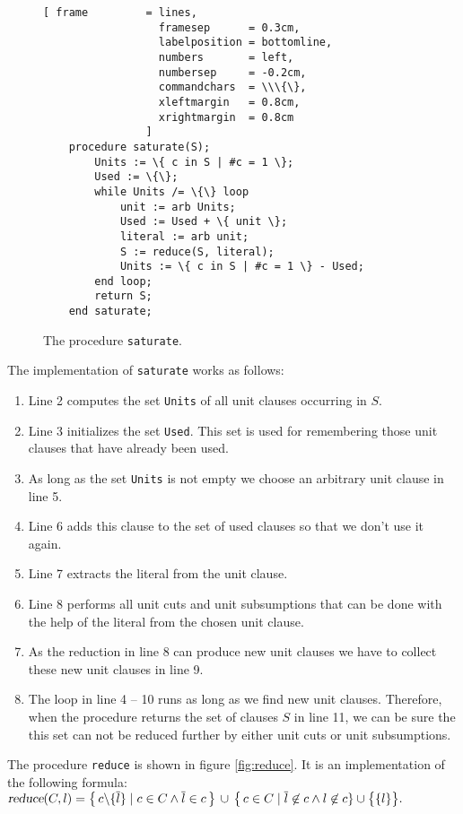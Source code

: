 \begin{figure}[!ht]
  \centering
\begin{Verbatim}[ frame         = lines, 
                  framesep      = 0.3cm, 
                  labelposition = bottomline,
                  numbers       = left,
                  numbersep     = -0.2cm,
                  commandchars  = \\\{\},
                  xleftmargin   = 0.8cm,
                  xrightmargin  = 0.8cm
                ]
    procedure saturate(S);
        Units := \{ c in S | #c = 1 \};
        Used := \{\};
        while Units /= \{\} loop
            unit := arb Units;
            Used := Used + \{ unit \};
            literal := arb unit;
            S := reduce(S, literal);
            Units := \{ c in S | #c = 1 \} - Used;        
        end loop;
        return S;
    end saturate;
\end{Verbatim}
\vspace*{-0.3cm}
  \caption{The procedure \texttt{saturate}.}
  \label{fig:saturate}
\end{figure} 
The implementation of  \texttt{saturate} works as follows: 
\begin{enumerate}
\item Line 2 computes the set \texttt{Units} of all unit clauses occurring in $S$.  
\item Line 3 initializes the set \texttt{Used}.  This set is used for remembering
      those unit clauses that have already been used.
\item As long as the set  \texttt{Units} is not empty we choose an arbitrary 
      unit clause in line 5.
\item Line 6 adds this clause to the set of used clauses so that we don't use it again.
\item Line 7 extracts the literal from the unit clause.
\item Line 8 performs all unit cuts and unit subsumptions that can be done
      with the help of the literal from the chosen unit clause.
\item As the reduction in line 8 can produce new unit clauses we have to collect these new
      unit clauses in line 9.
\item The loop in line  4 -- 10 runs as long as we find new unit clauses.
      Therefore, when the procedure returns the set of clauses $S$ in line 11, 
      we can be sure the this set can not be reduced further by either unit cuts or unit subsumptions.
\end{enumerate}
The procedure \texttt{reduce} is shown in figure \ref{fig:reduce}.
It is an implementation of the following formula:
\\[0.2cm]
\hspace*{1.3cm}
$\textsl{reduce}(C,l)  = 
 \bigl\{\, c \backslash \{\overline{l}\} \;|\; c \in C \wedge \overline{l} \in c \,\bigr\} 
       \,\cup\, \bigl\{\, c \in C \mid \overline{l} \not\in c \wedge l \not\in c \} \cup \bigl\{\{l\}\bigr\}.
$
\\

